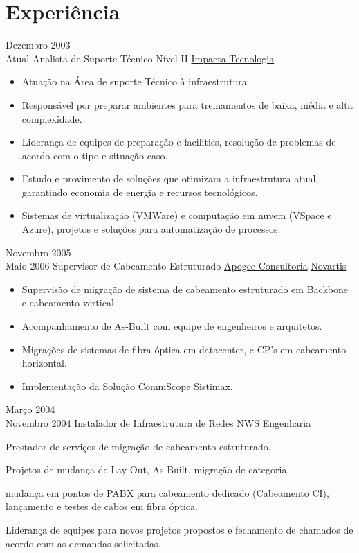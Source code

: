 \documentclass[letterpaper]{twentysecondcv} %
\begin{document}
\section{Experiência}

\begin{twenty} %
	\twentyitem
    	{Dezembro 2003 \\ Atual}
        {Analista de Suporte Técnico Nível II}
        {\href{http://www.impacta.com.br/}{Impacta Tecnologia}}
        {}
        {
        {\begin{itemize}
        \item Atuação na Área de suporte Técnico à infraestrutura.
        \item Responsável por preparar ambientes para treinamentos de baixa, média e alta complexidade.
        \item Liderança de equipes de preparação e facilities, resolução de problemas de acordo com o tipo e situação-caso. 
        \item Estudo e provimento de soluções que otimizam a infraestrutura atual, garantindo economia de energia e recursos tecnológicos. 
        \item Sistemas de virtualização (VMWare) e computação em nuvem (VSpace e Azure), projetos e soluções para automatização de processos.
    \end{itemize}}
        }
        
    \twentyitem
   		{Novembro 2005 \\ Maio 2006}
        {Supervisor de Cabeamento Estruturado}
        {\href{http://www.apogee.com.br}{Apogee Consultoria}}
        {\href{http://www.novartis.com.br}{Novartis}}
        {
        {\begin{itemize}
        \item Supervisão de migração de sistema de cabeamento estruturado em Backbone e cabeamento vertical
        \item Acompanhamento de As-Built com equipe de engenheiros e arquitetos.
       \item Migrações de sistemas de fibra óptica em datacenter, e CP's em cabeamento horizontal.
       \item Implementação da Solução CommScope Sistimax. 
    \end{itemize}}
        }
        
     \twentyitem
   		{Março 2004 \\ Novembro 2004}
        {Instalador de Infraestrutura de Redes}
        {NWS Engenharia}
        {}
        {
        \begin{itemize}
        \item {Prestador de serviços de migração de cabeamento estruturado. 
        \item Projetos de mudança de Lay-Out, As-Built, migração de categoria. 
        \item mudança em pontos de PABX para cabeamento dedicado (Cabeamento CI), lançamento e testes de cabos em fibra óptica.
        \item Liderança de equipes para novos projetos propostos e fechamento de chamados de acordo com as demandas solicitadas.}
        

\end{itemize}}
\end{twenty}
\end{document}
